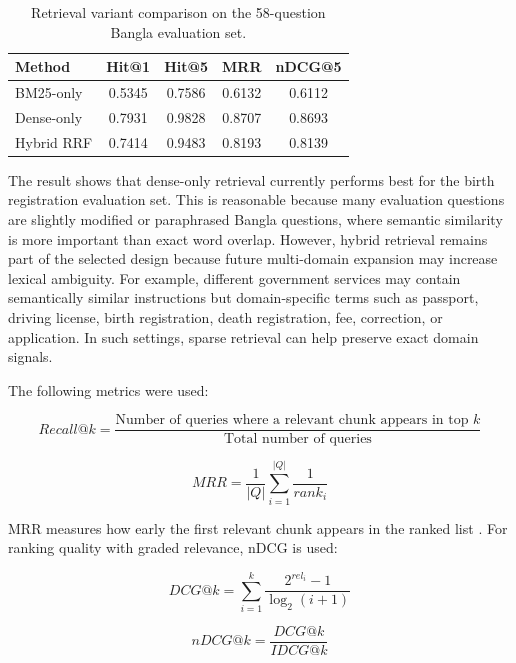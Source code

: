 \begin{table}[h]
\centering
\caption{Retrieval variant comparison on the 58-question Bangla evaluation set.}
\label{tab:retrieval_comparison_updated}
\begin{tabular}{|l|c|c|c|c|}
\hline
\textbf{Method} & \textbf{Hit@1} & \textbf{Hit@5} & \textbf{MRR} & \textbf{nDCG@5} \\
\hline
BM25-only & 0.5345 & 0.7586 & 0.6132 & 0.6112 \\
\hline
Dense-only & 0.7931 & 0.9828 & 0.8707 & 0.8693 \\
\hline
Hybrid RRF & 0.7414 & 0.9483 & 0.8193 & 0.8139 \\
\hline
\end{tabular}
\end{table}

The result shows that dense-only retrieval currently performs best for the birth registration evaluation set. This is reasonable because many evaluation questions are slightly modified or paraphrased Bangla questions, where semantic similarity is more important than exact word overlap. However, hybrid retrieval remains part of the selected design because future multi-domain expansion may increase lexical ambiguity. For example, different government services may contain semantically similar instructions but domain-specific terms such as passport, driving license, birth registration, death registration, fee, correction, or application. In such settings, sparse retrieval can help preserve exact domain signals.

The following metrics were used:

\begin{equation}
Recall@k = \frac{\text{Number of queries where a relevant chunk appears in top }k}{\text{Total number of queries}}
\end{equation}

\begin{equation}
MRR = \frac{1}{|Q|}\sum_{i=1}^{|Q|}\frac{1}{rank_i}
\end{equation}

MRR measures how early the first relevant chunk appears in the ranked list \cite{voorhees1999trec8qa,manning2008ir}. For ranking quality with graded relevance, nDCG is used:

\begin{equation}
DCG@k = \sum_{i=1}^{k}\frac{2^{rel_i}-1}{\log_2(i+1)}
\end{equation}

\begin{equation}
nDCG@k = \frac{DCG@k}{IDCG@k}
\end{equation}

